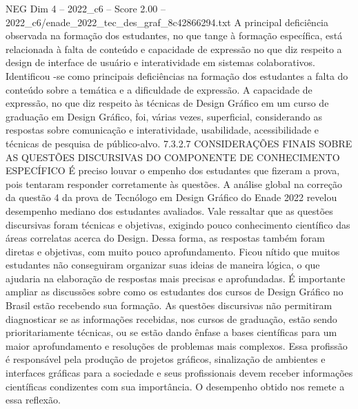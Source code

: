 \begin{textsample}{NEG Dim 4 – 2022\_c6 – Score 2.00 – 2022\_c6/enade\_2022\_tec\_des\_graf\_8c42866294.txt}
A principal deficiência observada na formação dos estudantes, no que tange à formação específica, está relacionada à falta de conteúdo e capacidade de expressão no que diz respeito a design de interface de usuário e interatividade em sistemas colaborativos.
Identificou -se como principais deficiências na formação dos estudantes a falta do conteúdo sobre a temática e a dificuldade de expressão.
A capacidade de expressão, no que diz respeito às técnicas de Design Gráfico em um curso de graduação em Design Gráfico, foi, várias vezes, superficial, considerando as respostas sobre comunicação e interatividade, usabilidade, acessibilidade e técnicas de pesquisa de público-alvo. 7.3.2.7 CONSIDERAÇÕES FINAIS SOBRE AS QUESTÕES DISCURSIVAS DO COMPONENTE DE CONHECIMENTO ESPECÍFICO É preciso louvar o empenho dos estudantes que fizeram a prova, pois tentaram responder corretamente às questões.
A análise global na correção da questão 4 da prova de Tecnólogo em Design Gráfico do Enade 2022 revelou desempenho mediano dos estudantes avaliados.
Vale ressaltar que as questões discursivas foram técnicas e objetivas, exigindo pouco conhecimento científico das áreas correlatas acerca do Design.
Dessa forma, as respostas também foram diretas e objetivas, com muito pouco aprofundamento.
Ficou nítido que muitos estudantes não conseguiram organizar suas ideias de maneira lógica, o que ajudaria na elaboração de respostas mais precisas e aprofundadas.
É importante ampliar as discussões sobre como os estudantes dos cursos de Design Gráfico no Brasil estão recebendo sua formação.
As questões discursivas não permitiram diagnosticar se as informações recebidas, nos cursos de graduação, estão sendo prioritariamente técnicas, ou se estão dando ênfase a bases científicas para um maior aprofundamento e resoluções de problemas mais complexos.
Essa profissão é responsável pela produção de projetos gráficos, sinalização de ambientes e interfaces gráficas para a sociedade e seus profissionais devem receber informações científicas condizentes com sua importância.
O desempenho obtido nos remete a essa reflexão.

\end{textsample}

